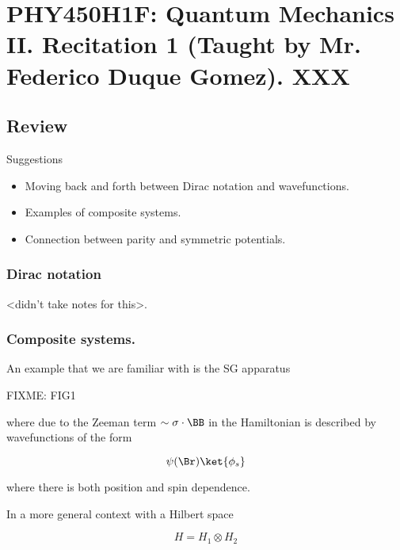 
%

\chapter{PHY450H1F: Quantum Mechanics II.  Recitation 1 (Taught by Mr. Federico Duque Gomez).  XXX}
\label{chap:qmTwoR1}
{}
\date{Sept 16, 2011}

\beginArtWithToc

\section{Review}

Suggestions
\begin{itemize}
\item Moving back and forth between Dirac notation and wavefunctions.
\item Examples of composite systems.
\item Connection between parity and symmetric potentials.
\end{itemize}

\subsection{Dirac notation}

<didn't take notes for this>.

\subsection{Composite systems.}

An example that we are familiar with is the SG apparatus

FIXME: FIG1

where due to the Zeeman term $\sim \sigma \cdot \BB$ in the Hamiltonian is described by wavefunctions of the form

\begin{equation}\label{eqn:qmTwoR1:n}
\psi(\Br) \ket{\phi_s}
\end{equation}

where there is both position and spin dependence.

In a more general context with a Hilbert space

\begin{equation}\label{eqn:qmTwoR1:n}
H = H_1 \otimes H_2
\end{equation}

